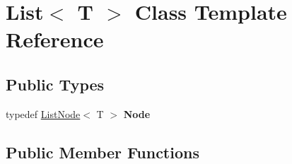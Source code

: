 \hypertarget{classList}{}\section{List$<$ T $>$ Class Template Reference}
\label{classList}
\subsection*{Public Types}
\begin{DoxyCompactItemize}
\item 
\mbox{\label{classList_a54ff19e7cbfcdaff8d41ca426689331d}} 
typedef \hyperlink{classListNode}{List\+Node}$<$ T $>$ {\bfseries Node}
\end{DoxyCompactItemize}
\subsection*{Public Member Functions}
